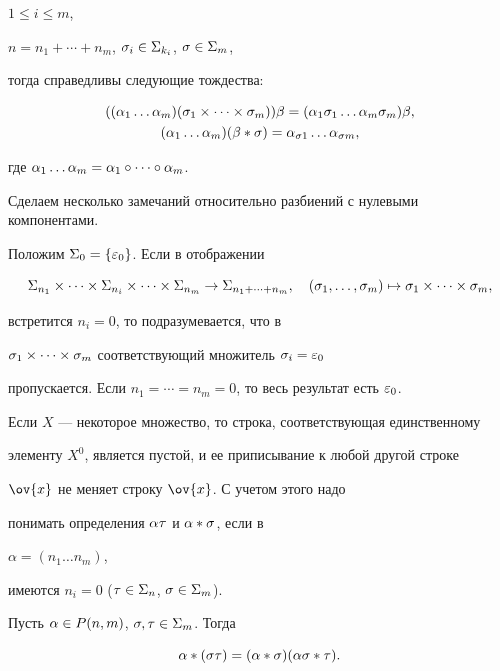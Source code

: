 $1\leq i \leq m$,


$n=n_1+ \dotsb +n_m$, $\sigma_i\in\Sigma_{k_i}$, $\sigma\in \Sigma_m$,


тогда справедливы следующие тождества:


\begin{gather}


((\al_1\dotsc\al_m)(\s_1\times\dotsb\times\s_m))\be=


(\al_1 \s_1\dotsc\al_m\s_m)\be, \\


%


(\al_1\dotsc\al_m)(\be*\s)=\al_{\s 1}\dotsc\al_{\s m},


\end{gather}


где $\alpha_1\dotsc\alpha_m=\alpha_1\circ \dotsb\circ \alpha_m$.





Сделаем несколько замечаний относительно разбиений с нулевыми компонентами.


Положим $\Sigma_0=\{\varepsilon_0\}$. Если в отображении


$$


\sym_{n_1}\times \dotsb \times \sym_{n_i}\times \dotsb \times \sym_{n_m}


\rightarrow \sym_{n_1+\dotsb +n_m},\quad (\s_1,\dotsc,\s_m)\mapsto


\s_1\times \dotsb\times \s_m,


$$


встретится $n_i=0$, то подразумевается, что в


$\sigma_1\times \dotsb\times \sigma_m$ соответствующий множитель $\sigma_i=\varepsilon_0$


пропускается. Если $n_1=\dotsb=n_m=0$, то весь результат есть $\varepsilon_0$.


Если $X$ --- некоторое множество, то строка, соответствующая единственному


элементу $X^0$, является пустой, и ее приписывание к любой другой строке


$\ov{x}$ не меняет строку $\ov{x}$. С учетом этого надо


понимать определения $\alpha \tau$ и $\alpha\ast \sigma$, если в


$\alpha=(n_1\dotsc n_m)$,


имеются $n_i=0$ ($\tau\in \Sigma_n$, $\sigma\in \Sigma_m$).








\begin{lem}


Пусть $\alpha\in P(n,m)$, $\sigma,\tau\in \Sigma_m$. Тогда


\begin{equation}


\al*(\s\t)=(\al*\s)(\al\s*\t).


\end{equation}


\end{lem}





